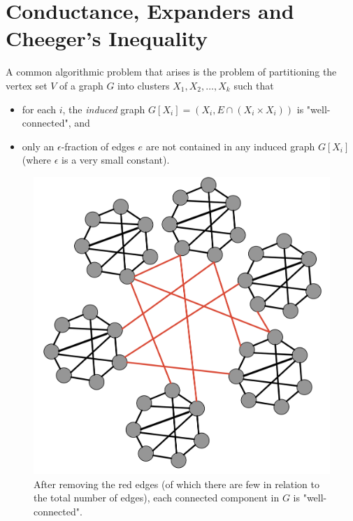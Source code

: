 \newcommand\vol{\operatorname{vol}}

\chapter{Conductance, Expanders and Cheeger's Inequality}
\label{chap:cheegersInequality}
\sloppy

A common algorithmic problem that arises is the problem of partitioning the vertex set $V$ of a graph $G$ into clusters $X_1, X_2, \dots, X_k$ such that 
\begin{itemize}
    \item for each $i$, the \emph{induced} graph $G[X_i] = (X_i, E \cap (X_i \times X_i))$ is "well-connected", and
    \item only an $\epsilon$-fraction of edges $e$ are not contained in any induced graph $G[X_i]$ (where $\epsilon$ is a very small constant).
\end{itemize}

\begin{figure}[!ht]
    \centering
    \includegraphics[scale=0.25]{fig/fig1_lecCheeger}
    \caption{After removing the red edges (of which there are few in relation to the total number of edges), each connected component in $G$ is "well-connected".}
\end{figure}

